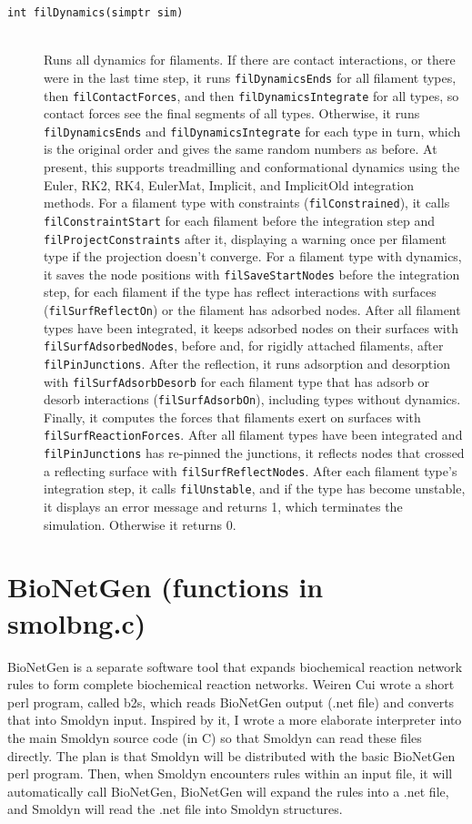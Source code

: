\documentclass {scrbook}
\newcommand {\ttt} {\texttt}
\begin{document}
\begin{description}
\item[\ttt{int filDynamics(simptr sim)}]
\hfill \\
Runs all dynamics for filaments. If there are contact interactions, or there were in the last time step, it runs \ttt{filDynamicsEnds} for all filament types, then \ttt{filContactForces}, and then \ttt{filDynamicsIntegrate} for all types, so contact forces see the final segments of all types. Otherwise, it runs \ttt{filDynamicsEnds} and \ttt{filDynamicsIntegrate} for each type in turn, which is the original order and gives the same random numbers as before. At present, this supports treadmilling and conformational dynamics using the Euler, RK2, RK4, EulerMat, Implicit, and ImplicitOld integration methods. For a filament type with constraints (\ttt{filConstrained}), it calls \ttt{filConstraintStart} for each filament before the integration step and \ttt{filProjectConstraints} after it, displaying a warning once per filament type if the projection doesn't converge. For a filament type with dynamics, it saves the node positions with \ttt{filSaveStartNodes} before the integration step, for each filament if the type has reflect interactions with surfaces (\ttt{filSurfReflectOn}) or the filament has adsorbed nodes. After all filament types have been integrated, it keeps adsorbed nodes on their surfaces with \ttt{filSurfAdsorbedNodes}, before and, for rigidly attached filaments, after \ttt{filPinJunctions}. After the reflection, it runs adsorption and desorption with \ttt{filSurfAdsorbDesorb} for each filament type that has adsorb or desorb interactions (\ttt{filSurfAdsorbOn}), including types without dynamics. Finally, it computes the forces that filaments exert on surfaces with \ttt{filSurfReactionForces}. After all filament types have been integrated and \ttt{filPinJunctions} has re-pinned the junctions, it reflects nodes that crossed a reflecting surface with \ttt{filSurfReflectNodes}. After each filament type's integration step, it calls \ttt{filUnstable}, and if the type has become unstable, it displays an error message and returns 1, which terminates the simulation. Otherwise it returns 0.

\end{description}

\section{BioNetGen (functions in smolbng.c)}

BioNetGen is a separate software tool that expands biochemical reaction network rules to form complete biochemical reaction networks. Weiren Cui wrote a short perl program, called b2s, which reads BioNetGen output (.net file) and converts that into Smoldyn input. Inspired by it, I wrote a more elaborate interpreter into the main Smoldyn source code (in C) so that Smoldyn can read these files directly. The plan is that Smoldyn will be distributed with the basic BioNetGen perl program. Then, when Smoldyn encounters rules within an input file, it will automatically call BioNetGen, BioNetGen will expand the rules into a .net file, and Smoldyn will read the .net file into Smoldyn structures.
\end{document}
